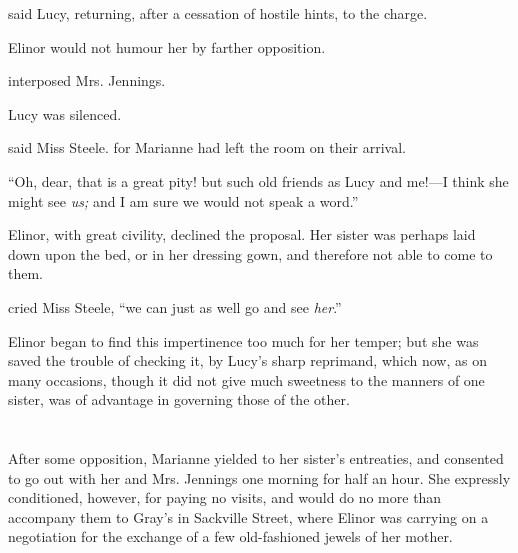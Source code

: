 said Lucy, returning, after a cessation of hostile hints, to the charge.



Elinor would not humour her by farther opposition.


 interposed Mrs. Jennings. 

Lucy was silenced.

 said Miss Steele.  for Marianne had left the room on their arrival.


“Oh, dear, that is a great pity! but such old friends as Lucy and me!---I think she might see {\em us;} and I am sure we would not speak a word.”

Elinor, with great civility, declined the proposal. Her sister was perhaps laid down upon the bed, or in her dressing gown, and therefore not able to come to them.

 cried Miss Steele, “we can just as well go and see {\em her}.”

Elinor began to find this impertinence too much for her temper; but she was saved the trouble of checking it, by Lucy's sharp reprimand, which now, as on many occasions, though it did not give much sweetness to the manners of one sister, was of advantage in governing those of the other.

\chapter{} %

After some opposition, Marianne yielded to her sister's entreaties, and consented to go out with her and Mrs. Jennings one morning for half an hour. She expressly conditioned, however, for paying no visits, and would do no more than accompany them to Gray's in Sackville Street, where Elinor was carrying on a negotiation for the exchange of a few old-fashioned jewels of her mother.

